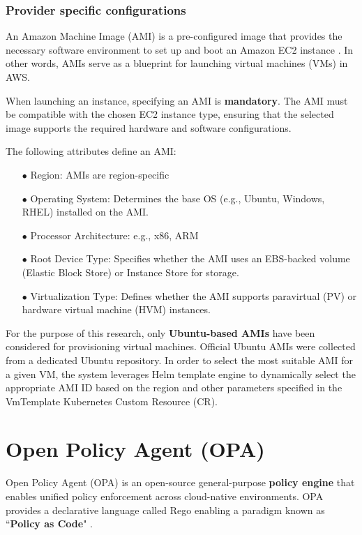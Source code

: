 \subsubsection{Provider specific configurations}

An Amazon Machine Image (AMI) is a pre-configured image that provides the necessary software environment to set up and boot an Amazon EC2 instance \cite{aws_AMIs}. In other words, AMIs serve as a blueprint for launching virtual machines (VMs) in AWS.

When launching an instance, specifying an AMI is \textbf{mandatory}. The AMI must be compatible with the chosen EC2 instance type, ensuring that the selected image supports the required hardware and software configurations.

The following attributes define an AMI:
\begin{itemize}[itemsep=0.2pt, topsep=1pt] 
  \item[$\bullet$] Region: AMIs are region-specific
  \item[$\bullet$] Operating System: Determines the base OS (e.g., Ubuntu, Windows, RHEL) installed on the AMI.
  \item[$\bullet$] Processor Architecture: e.g., x86, ARM
  \item[$\bullet$] Root Device Type: Specifies whether the AMI uses an EBS-backed volume (Elastic Block Store) or Instance Store for storage.
  \item[$\bullet$] Virtualization Type: Defines whether the AMI supports paravirtual (PV) or hardware virtual machine (HVM) instances.
\end{itemize}


For the purpose of this research, only \textbf{Ubuntu-based AMIs} have been considered for provisioning virtual machines. Official Ubuntu AMIs were collected from a dedicated Ubuntu repository.
In order to select the most suitable AMI for a given VM, the system leverages Helm template engine to dynamically select the appropriate AMI ID based on the region and other parameters specified in the VmTemplate Kubernetes Custom Resource (CR).



\newpage

\section{Open Policy Agent (OPA)}

Open Policy Agent (OPA) is an open-source general-purpose \textbf{policy engine} that enables unified policy enforcement across cloud-native environments. OPA provides a declarative language called Rego enabling a paradigm known as ``\textbf{Policy as Code}" \cite{opa_docs}.

